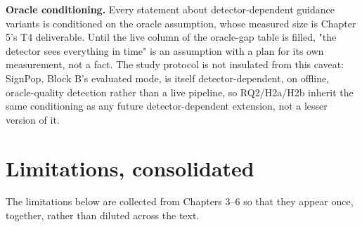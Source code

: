 \textbf{Oracle conditioning.} Every statement about detector-dependent guidance variants is conditioned
on the oracle assumption, whose measured size is Chapter 5's T4 deliverable. Until the live column
of the oracle-gap table is filled, "the detector sees everything in time" is an assumption with a
plan for its own measurement, not a fact. The study protocol is not insulated from this caveat:
SignPop, Block B's evaluated mode, is itself detector-dependent, on offline, oracle-quality
detection rather than a live pipeline, so RQ2/H2a/H2b inherit the same conditioning as any future
detector-dependent extension, not a lesser version of it.

\section{Limitations, consolidated}

The limitations below are collected from Chapters 3–6 so that they appear once, together, rather
than diluted across the text.

